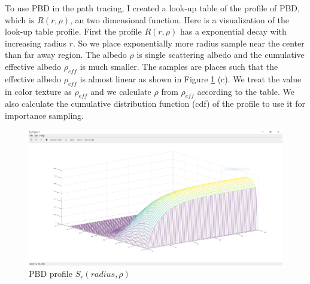 \documentclass[letterpaper,12pt]{article}
\begin{document}
To use PBD in the path tracing, I created a look-up table of the profile of PBD, which is $R(r, \rho)$, an two dimensional function. Here is a visualization of the look-up table profile. First the profile $R(r, \rho)$ has a exponential decay with increasing radius $r$. So we place exponentially more radius sample near the center than far away region. The albedo $\rho$ is single scattering albedo and the cumulative effective albedo $\rho_{eff}$ is much smaller. The samples are places such that the effective albedo $\rho_{eff}$ is almost linear as shown in Figure \ref{fig:example} (c). We treat the value in color texture as $\rho_{eff}$ and we calculate $\rho$ from $\rho_{eff}$ according to the table. We also calculate the cumulative distribution function (cdf) of the profile to use it for importance sampling.

\begin{figure}%
    \centering
    \caption{}%
    \label{fig:example}%
\end{figure}

\begin{figure}[H] 
        \centering \includegraphics[width=0.8\columnwidth]{profile.png}
        \caption{\label{fig:profile}PBD profile $S_r(radius, \rho)$}
\end{figure}
\end{document}
